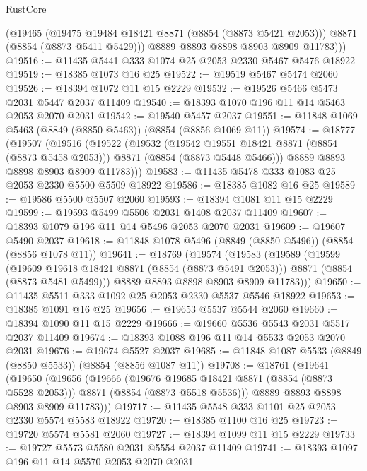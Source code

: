 \begin{lexlean}{RustCore}
\begin{coremodule}
          (@19465
            (@19475 @19484 @18421 @8871 (@8854 (@8873 @5421 @2053)))
            @8871
            (@8854 (@8873 @5411 @5429)))
          @8889
          @8893
          @8898
          @8903
          @8909
          @11783)))
@19516 := @11435 @5441 @333 @1074 @25 @2053 @2330 @5467 @5476 @18922
@19519 := @18385 @1073 @16 @25
@19522 := @19519 @5467 @5474 @2060
@19526 := @18394 @1072 @11 @15 @2229
@19532 := @19526 @5466 @5473 @2031 @5447 @2037 @11409
@19540 := @18393 @1070 @196 @11 @14 @5463 @2053 @2070 @2031
@19542 := @19540 @5457 @2037
@19551 := @11848 @1069 @5463 (@8849 (@8850 @5463)) (@8854 (@8856 @1069 @11))
@19574 := @18777
    (@19507
      (@19516
        (@19522
          (@19532
            (@19542 @19551 @18421 @8871 (@8854 (@8873 @5458 @2053)))
            @8871
            (@8854 (@8873 @5448 @5466)))
          @8889
          @8893
          @8898
          @8903
          @8909
          @11783)))
@19583 := @11435 @5478 @333 @1083 @25 @2053 @2330 @5500 @5509 @18922
@19586 := @18385 @1082 @16 @25
@19589 := @19586 @5500 @5507 @2060
@19593 := @18394 @1081 @11 @15 @2229
@19599 := @19593 @5499 @5506 @2031 @1408 @2037 @11409
@19607 := @18393 @1079 @196 @11 @14 @5496 @2053 @2070 @2031
@19609 := @19607 @5490 @2037
@19618 := @11848 @1078 @5496 (@8849 (@8850 @5496)) (@8854 (@8856 @1078 @11))
@19641 := @18769
    (@19574
      (@19583
        (@19589
          (@19599
            (@19609 @19618 @18421 @8871 (@8854 (@8873 @5491 @2053)))
            @8871
            (@8854 (@8873 @5481 @5499)))
          @8889
          @8893
          @8898
          @8903
          @8909
          @11783)))
@19650 := @11435 @5511 @333 @1092 @25 @2053 @2330 @5537 @5546 @18922
@19653 := @18385 @1091 @16 @25
@19656 := @19653 @5537 @5544 @2060
@19660 := @18394 @1090 @11 @15 @2229
@19666 := @19660 @5536 @5543 @2031 @5517 @2037 @11409
@19674 := @18393 @1088 @196 @11 @14 @5533 @2053 @2070 @2031
@19676 := @19674 @5527 @2037
@19685 := @11848 @1087 @5533 (@8849 (@8850 @5533)) (@8854 (@8856 @1087 @11))
@19708 := @18761
    (@19641
      (@19650
        (@19656
          (@19666
            (@19676 @19685 @18421 @8871 (@8854 (@8873 @5528 @2053)))
            @8871
            (@8854 (@8873 @5518 @5536)))
          @8889
          @8893
          @8898
          @8903
          @8909
          @11783)))
@19717 := @11435 @5548 @333 @1101 @25 @2053 @2330 @5574 @5583 @18922
@19720 := @18385 @1100 @16 @25
@19723 := @19720 @5574 @5581 @2060
@19727 := @18394 @1099 @11 @15 @2229
@19733 := @19727 @5573 @5580 @2031 @5554 @2037 @11409
@19741 := @18393 @1097 @196 @11 @14 @5570 @2053 @2070 @2031

\end{coremodule}
\end{lexlean}
